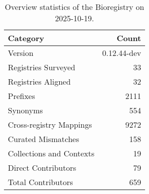 \begin{table}
\caption{Overview statistics of the Bioregistry on 2025-10-19.}
\label{tab:bioregistry-summary}
\begin{tabular}{lr}
\toprule
Category & Count \\
\midrule
Version & 0.12.44-dev \\
Registries Surveyed & 33 \\
Registries Aligned & 32 \\
Prefixes & 2111 \\
Synonyms & 554 \\
Cross-registry Mappings & 9272 \\
Curated Mismatches & 158 \\
Collections and Contexts & 19 \\
Direct Contributors & 79 \\
Total Contributors & 659 \\
\bottomrule
\end{tabular}
\end{table}
